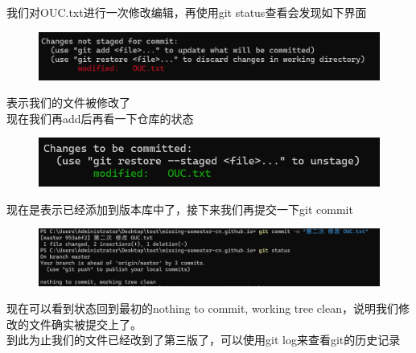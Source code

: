 \documentclass[
    report,     %
    oneside,    %
    UTF8,       %
    zihao=-4    %
]{config} %
\begin{document}
我们对OUC.txt进行一次修改编辑，再使用git status查看会发现如下界面

\begin{figure}[H] %
    \centering %
    \includegraphics[width=0.9\linewidth]{image7.png}
    \caption{} %
    \label{fig:example1} %
\end{figure}
\vspace{-0.7em}  %

表示我们的文件被修改了\\

现在我们再add后再看一下仓库的状态

\begin{figure}[H] %
    \centering %
    \includegraphics[width=0.9\linewidth]{image8.png}
    \caption{} %
    \label{fig:example1} %
\end{figure}
\vspace{-0.7em}  %

现在是表示已经添加到版本库中了，接下来我们再提交一下git commit

\begin{figure}[H] %
    \centering %
    \includegraphics[width=0.9\linewidth]{image9.png}
    \caption{} %
    \label{fig:example1} %
\end{figure}
\vspace{-0.7em}  %

现在可以看到状态回到最初的nothing to commit, working tree clean，说明我们修改的文件确实被提交上了。\\

到此为止我们的文件已经改到了第三版了，可以使用git log来查看git的历史记录
\end{document}
